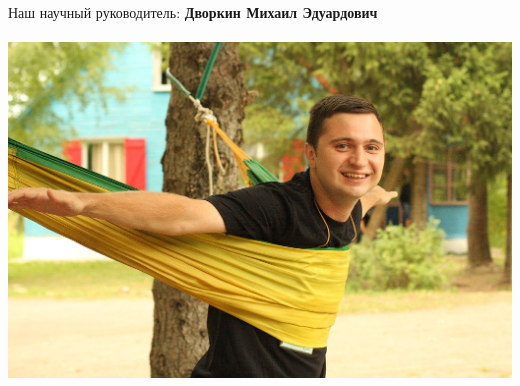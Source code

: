 \documentclass[12pt]{article}
\begin{document}
    

    \newpage %

    Наш научный руководитель: { \bf Дворкин Михаил Эдуардович } \\
    \\
    \includegraphics[scale=0.5]{dvorkin2.jpg}\hfill
    

        
\end{document}
